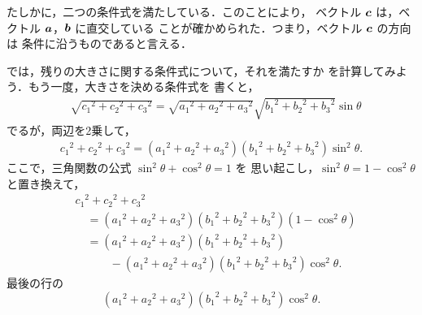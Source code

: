                 たしかに，二つの条件式を満たしている．このことにより，
                ベクトル $\boldsymbol{c}$ は，ベクトル $\boldsymbol{a}$，$\boldsymbol{b}$ に直交している
                ことが確かめられた．つまり，ベクトル $\boldsymbol{c}$ の方向は
                条件に沿うものであると言える．

                では，残りの大きさに関する条件式について，それを満たすか
                を計算してみよう．もう一度，大きさを決める条件式を
                書くと，
                    \begin{align*}
                        &\sqrt{{c_{1}}^{2}+{c_{2}}^{2}+{c_{3}}^{2}}
                        =
                        \sqrt{{a_{1}}^{2}+{a_{2}}^{2}+{a_{3}}^{2}}
                        \sqrt{{b_{1}}^{2}+{b_{2}}^{2}+{b_{3}}^{2}}
                        \sin\theta
                    \end{align*}
                でるが，両辺を2乗して，
                    \begin{align*}
                        {c_{1}}^{2}+{c_{2}}^{2}+{c_{3}}^{2}
                        =
                        \left({a_{1}}^{2}+{a_{2}}^{2}+{a_{3}}^{2}\right)
                        \left({b_{1}}^{2}+{b_{2}}^{2}+{b_{3}}^{2}\right)
                        {\sin}^{2}\theta.
                    \end{align*}
                ここで，三角関数の公式 ${\sin}^{2}\theta + {\cos}^{2}\theta = 1$ を
                思い起こし，${\sin}^{2}\theta = 1 - {\cos}^{2}\theta $ と置き換えて，
                    \begin{align*}
                        &{c_{1}}^{2}+{c_{2}}^{2}+{c_{3}}^{2} \\
                        &\quad =    \left({a_{1}}^{2}+{a_{2}}^{2}+{a_{3}}^{2}\right)
                                    \left({b_{1}}^{2}+{b_{2}}^{2}+{b_{3}}^{2}\right)
                                    \left(1 - {\cos}^{2}\theta \right) \\
                        &\quad =    \left({a_{1}}^{2}+{a_{2}}^{2}+{a_{3}}^{2}\right)
                                    \left({b_{1}}^{2}+{b_{2}}^{2}+{b_{3}}^{2}\right) \\
                                    &\quad \qquad -\left({a_{1}}^{2}+{a_{2}}^{2}+{a_{3}}^{2}\right)
                                        \left({b_{1}}^{2}+{b_{2}}^{2}+{b_{3}}^{2}\right)
                                        {\cos}^{2}\theta.
                    \end{align*}
                最後の行の
                    \begin{equation*}
                        \left({a_{1}}^{2}+{a_{2}}^{2}+{a_{3}}^{2}\right)
                        \left({b_{1}}^{2}+{b_{2}}^{2}+{b_{3}}^{2}\right)
                        {\cos}^{2}\theta.
                    \end{equation*}
